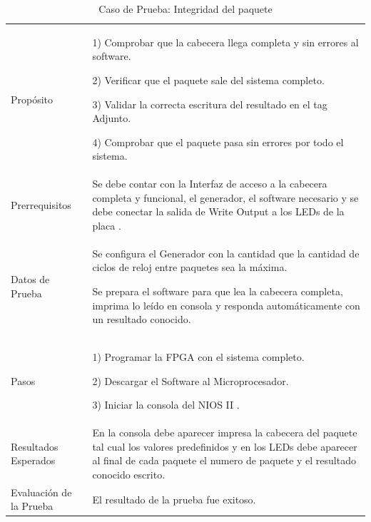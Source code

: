 \begin{table}
	\begin{tabular}{|>{\columncolor[gray]{0.8}}l|p{9cm}|} \hline
\multicolumn{2}{|>{\columncolor[gray]{0.8}}l|}{\textbf{Caso de Prueba: Integridad del paquete }}\\ \hline
Propósito  & 1) Comprobar que la cabecera llega completa y sin errores al software. 

2) Verificar que el paquete sale del sistema completo.

3) Validar la correcta escritura del resultado en el tag Adjunto.

4) Comprobar que el paquete pasa sin errores por todo el sistema. 
\\ \hline
 Prerrequisitos  & Se debe contar con la Interfaz de acceso a la cabecera completa y funcional, el generador, el software necesario y se debe conectar la salida de Write Output a los LEDs de la placa .\\ \hline
 Datos de Prueba & Se configura el Generador con la cantidad que la cantidad de ciclos de reloj entre paquetes sea la máxima. 

Se prepara el software para que lea la cabecera completa, imprima lo leído en consola y responda automáticamente con un resultado conocido. 
 \\ \hline
 Pasos & 1) Programar la FPGA con el sistema completo.

2) Descargar el Software al Microprocesador.

3) Iniciar la consola del NIOS II .
\\ \hline
 Resultados Esperados & En la consola debe aparecer impresa la cabecera del paquete tal cual los valores predefinidos y en los LEDs debe aparecer al final de cada paquete el numero de paquete y el resultado conocido escrito.  \\ \hline
 Evaluación de la Prueba  & El resultado de la prueba fue exitoso.\\ \hline
	\end{tabular}
	\caption{Caso de Prueba: Integridad del paquete}
	\label{tab:integridad}
\end{table}
